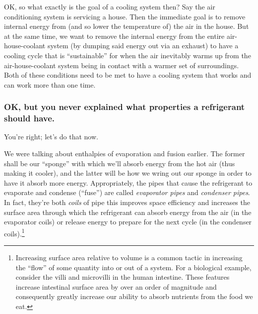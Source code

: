\documentclass[../main/main.tex]{subfiles}
\begin{document}
OK, so what exactly is the goal of a cooling system then?
Say the air conditioning system is servicing a house. Then the immediate
goal is to remove internal energy from (and so lower the temperature of)
the air in the house.
But at the same time, we want to remove the internal energy from the entire
air-house-coolant system (by dumping said energy out via an exhaust)
to have a cooling cycle that is ``sustainable'' for when the air
inevitably warms up from the air-house-coolant system being in contact
with a warmer set of surroundings.
Both of these conditions need to be met to have a cooling system
that works and can work more than one time.

\subsubsection*{OK, but you never explained what properties a refrigerant
should have.}
You're right; let's do that now.\par

We were talking about enthalpies of evaporation and fusion earlier.
The former shall be our ``sponge'' with which we'll absorb energy
from the hot air (thus making it cooler),
and the latter will be how we wring out our sponge 
in order to have it absorb more energy.
Appropriately, the pipes that cause the refrigerant to
evaporate and condense (``fuse'') are called
\emph{evaporator pipes} and \emph{condenser pipes}.
In fact, they're both \emph{coils} of pipe \textemdash{}
this improves space efficiency and increases the surface area
through which the refrigerant can absorb energy from the air
(in the evaporator coils) or release energy to prepare for
the next cycle (in the condenser coils).\footnote
{
    Increasing surface area relative to volume is a common
    tactic in increasing the ``flow'' of some quantity
    into or out of a system. For a biological example,
    consider the villi and microvilli in the human intestine. 
    These features increase intestinal surface area
    by over an order of magnitude and consequently greatly
    increase our ability to absorb nutrients from the food
    we eat.
}\par
\end{document}
